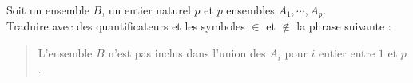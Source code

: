 Soit un ensemble $B$, un entier naturel $p$ et  $p$ ensembles $A_1,\cdots,A_p$.\\
Traduire avec des quantificateurs et les symboles $\in$ et $\not\in$ la phrase suivante :
\begin{quotation}
 L'ensemble $B$ n'est pas inclus dans l'union des $A_i$ pour $i$ entier entre $1$ et $p$.
\end{quotation}
\bigskip \bigskip